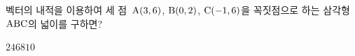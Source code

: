 벡터의 내적을 이용하여 세 점~$\mathrm{A}(3{,}\mkern3mu\mathopen{}6)$, $\mathrm{B}(0{,}\mkern3mu\mathopen{}2)$, $\mathrm{C}(-1{,}\mkern3mu\mathopen{}6)$을 꼭짓점으로 하는 삼각형~$\mathrm{ABC}$의 넓이를 구하면?
\begin{choices32}{$2$}{$4$}{$6$}{$8$}{$10$}\end{choices32}
